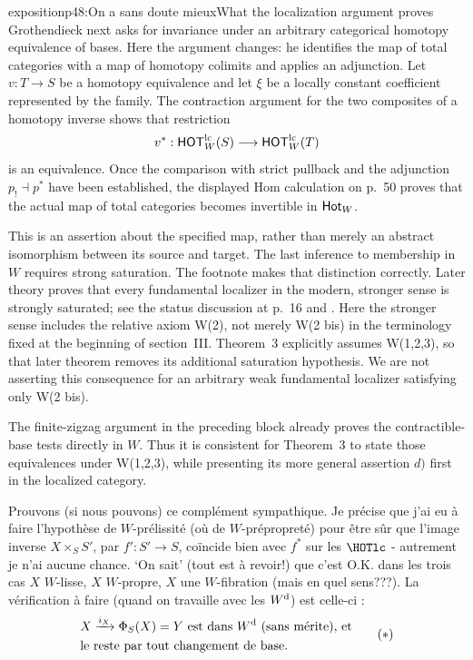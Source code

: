 \begin{dcomment}{exposition}{p48:On a sans doute mieux}{What the localization argument proves}
Grothendieck next asks for invariance under an arbitrary categorical homotopy equivalence of bases. Here the argument changes: he identifies the map of total categories with a map of homotopy colimits and applies an adjunction. Let $v:T\to S$ be a homotopy equivalence and let $\xi$ be a locally constant coefficient represented by the family. The contraction argument for the two composites of a homotopy inverse shows that restriction
\[
 v^*:\mathsf{HOT}_W^{\mathrm{lc}}(S)\longrightarrow\mathsf{HOT}_W^{\mathrm{lc}}(T)
\]
is an equivalence. Once the comparison with strict pullback and the adjunction $p_!\dashv p^*$ have been established, the displayed Hom calculation on p.~50 proves that the actual map of total categories becomes invertible in $\mathsf{Hot}_W$.

This is an assertion about the specified map, rather than merely an abstract isomorphism between its source and target. The last inference to membership in $W$ requires strong saturation. The footnote makes that distinction correctly. Later theory proves that every fundamental localizer in the modern, stronger sense is strongly saturated; see the status discussion at p.~16 and \citep[Proposition~4.2.4]{Cisinski2006}. Here the stronger sense includes the relative axiom W(2), not merely W(2 bis) in the terminology fixed at the beginning of section~III. Theorem~3 explicitly assumes W(1,2,3), so that later theorem removes its additional saturation hypothesis. We are not asserting this consequence for an arbitrary weak fundamental localizer satisfying only W(2 bis).

The finite-zigzag argument in the preceding block already proves the contractible-base tests directly in $W$. Thus it is consistent for Theorem~3 to state those equivalences under W(1,2,3), while presenting its more general assertion $d)$ first in the localized category.
\end{dcomment}


Prouvons (si nous pouvons) ce complément sympathique. Je précise que j'ai eu à faire l'hypothèse de $W$-prélissité (où de $W$-prépropreté) pour être sûr que l'image inverse $X \times_S S'$, par $f' : S' \longrightarrow S$, coïncide bien avec $f^*$ sur les $\HOTlc$ - autrement je n'ai aucune chance. %
`On sait' (tout est à revoir!) que c'est O.K. dans les trois cas $X$ $W$-lisse, $X$ $W$-propre, $X$ une $W$-fibration (mais en quel sens???). La vérification à faire (quand on travaille avec les $W^{\mathrm{d}}$) est celle-ci :
\[ \begin{aligned}
&X \xrightarrow{i_X} \Phi_S(X) = Y \text{ est dans } \Wd \text{ (sans mérite), et} \\
&\text{le reste par tout changement de base.}
\end{aligned} \tag*{$(*)$} \]

